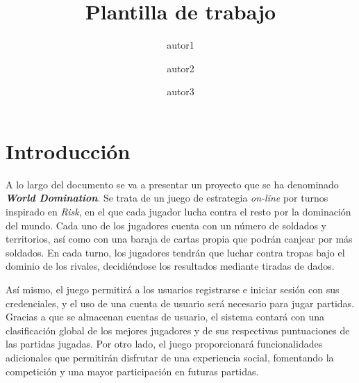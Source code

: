 \documentclass[11pt, a4paper, titlepage]{article}
\title{Plantilla de trabajo}
\author{autor1 \and autor2 \and autor3}
\date{\monthyear}
\begin{document}
 


\begin{titlepage}

\thispagestyle{empty}


\end{titlepage}
\newpage





\thispagestyle{empty}
\fontsize{11pt}{11pt}\selectfont

\setcounter{tocdepth}{4}

{
    \hypersetup{linkcolor=black}
    \doublespacing
    \tableofcontents
}

\thispagestyle{empty}

\clearpage
\setcounter{page}{1}
\section{Introducción}
A lo largo del documento se va a presentar un proyecto que se ha denominado\textit{ \textbf{World Domination}}. Se trata de un juego de estrategia \textit{on-line} por turnos inspirado en \textit{Risk}, en el que cada jugador lucha contra el resto por la dominación del mundo. Cada uno de los jugadores cuenta con un número de soldados y territorios, así como con una baraja de cartas propia que podrán canjear por más soldados. En cada turno, los jugadores tendrán que luchar contra tropas bajo el dominio de los rivales, decidiéndose los resultados mediante tiradas de dados. \newline


Así mismo, el juego permitirá a los usuarios registrarse e iniciar sesión con sus credenciales, y el uso de una cuenta de usuario será necesario para jugar partidas. Gracias a que se almacenan cuentas de usuario, el sistema contará con una clasificación global de los mejores jugadores y de sus respectivas puntuaciones de las partidas jugadas. Por otro lado, el juego proporcionará funcionalidades adicionales que permitirán disfrutar de una experiencia social, fomentando la competición y una mayor participación en futuras partidas.\\ %
\end{document}
